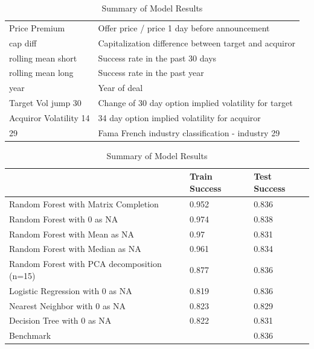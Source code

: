 \documentclass[12pt]{article}
\begin{document}
\begin{table}[h]
\begin{tabular}{ll}
Price Premium            & Offer price / price 1 day before announcement                \\
cap diff                & Capitalization difference between target and acquiror       \\
rolling mean short               & Success rate in the past 30 days  \\
rolling mean long              & Success rate in the past year                            \\
year              & Year of deal       \\
Target Vol jump 30         & Change of 30 day option implied volatility for target     \\
Acquiror Volatility 14 & 34 day option implied volatility for acquiror              \\
29          & Fama French industry classification - industry 29            
\end{tabular}

\caption{Summary of Model Results}
\label{my-label}
\begin{tabular}{lll}
\hline
                                            & Train Success & Test Success \\ \hline
Random Forest with Matrix Completion        & 0.952         & 0.836        \\ \hline
Random Forest with 0 as NA                  & 0.974         & 0.838        \\ \hline
Random Forest with Mean as NA               & 0.97          & 0.831        \\ \hline
Random Forest with Median as NA             & 0.961         & 0.834        \\ \hline
Random Forest with PCA decomposition (n=15) & 0.877         & 0.836        \\ \hline
Logistic Regression with 0 as NA            & 0.819         & 0.836        \\ \hline
Nearest Neighbor with 0 as NA               & 0.823         & 0.829        \\ \hline
Decision Tree with 0 as NA                  & 0.822         & 0.831        \\ \hline
Benchmark                                   &               & 0.836       
\end{tabular}
\end{table}
\end{document}
